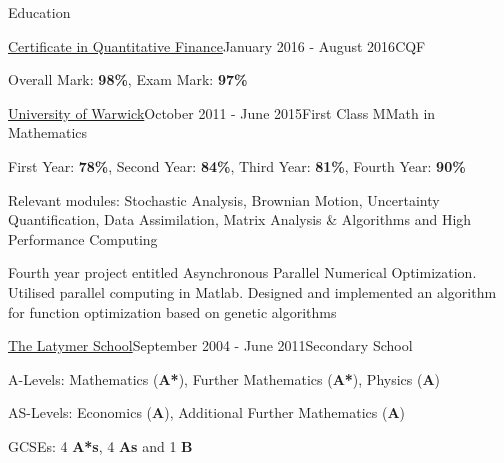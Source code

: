 \documentclass{resume} %
\begin{document}
\begin{rSection}{Education}
	\begin{rSubsection}{\href{https://www.cqf.com/}{Certificate in Quantitative Finance}}{January 2016 - August 2016}{CQF}{}
		\item Overall Mark: {\bf 98\%}, Exam Mark: {\bf 97\%}
		\iffalse
		\item Part time financial engineering program that covers a range of topics such as stochastic analysis, portfolio optimization, option pricing, Monte-Carlo methods, finite differences method
		\item Learning about modelling within different asset classes such as equities, currencies, fixed income, commodities and credit
		\fi
	\end{rSubsection}
	\begin{rSubsection}{\href{https://warwick.ac.uk/fac/sci/maths/}{University of Warwick}}{October 2011 - June 2015}{First Class MMath in Mathematics}{}
		\item First Year: {\bf 78\%},  %
		Second Year: {\bf 84\%},  %
		Third Year: {\bf 81\%}, %
		Fourth Year: {\bf 90\%} %
		\item  Relevant modules: Stochastic Analysis, Brownian Motion, Uncertainty Quantification, Data Assimilation, Matrix Analysis \& Algorithms and High Performance Computing
		\item Fourth year project entitled Asynchronous Parallel Numerical Optimization. Utilised parallel computing in Matlab. Designed and implemented an algorithm for function optimization based on genetic algorithms
		\iffalse	
		\item Warwick Mathematics Society - contributed by composing revision guides for over 800 students, running LaTeX workshops and revision lectures for over 300 students. Warwick Poker Society - developed a new website and taught members about analytical strategies
		\fi
	\end{rSubsection}
	\begin{rSubsection}{\href{https://www.latymer.co.uk}{The Latymer School}}{September 2004 - June 2011}{Secondary School}{}
		\item A-Levels: Mathematics ({\bf A*}), Further Mathematics ({\bf A*}), Physics ({\bf A}) 
		\item AS-Levels: Economics ({\bf A}), Additional Further Mathematics ({\bf A}) 
		\item GCSEs: 4 {\bf A*s}, 4 {\bf As} and 1 {\bf B}
	\end{rSubsection}
\end{rSection}
\end{document}
